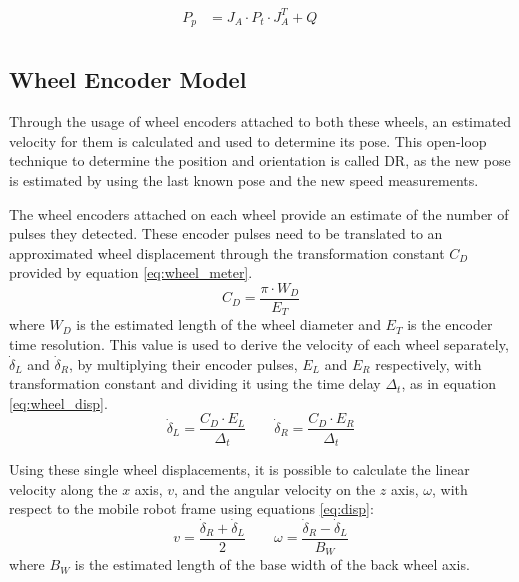 \begin{align}
    P_{p} & = J_A \cdot P_t \cdot J_A^T + Q && \\
\end{align}


\subsection{Wheel Encoder Model}

\noindent
Through the usage of wheel encoders attached to both these wheels, an estimated velocity for them is calculated and used to determine its pose.
This open-loop technique to determine the position and orientation is called \gls{DR}, as the new pose is estimated by using the last known pose and the new speed measurements.

The wheel encoders attached on each wheel provide an estimate of the number of pulses they detected. These encoder pulses need to be translated to an approximated wheel displacement through the transformation constant $C_{D}$ provided by equation \ref{eq:wheel_meter}.
\begin{equation}
C_{D} = \frac{\pi \cdot W_D }{E_T}
\label{eq:wheel_meter}
\end{equation} where $W_D$ is the estimated length of the wheel diameter and $E_T$ is the encoder time resolution.
This value is used to derive the velocity of each wheel separately, $\dot \delta_L$ and $\dot \delta_R$, by multiplying their encoder pulses, $E_L$ and  $E_R$ respectively, with transformation constant and dividing it using the time delay $\Delta_t$, as in equation \ref{eq:wheel_disp}.
\begin{equation}
\dot \delta_{L} = \frac{C_D \cdot E_L}{\Delta_t}  \qquad
\dot \delta_{R} = \frac{C_D \cdot E_R}{\Delta_t}
\label{eq:wheel_disp}
\end{equation}

Using these single wheel displacements, it is possible to calculate the linear velocity along the $x$ axis, $v$, and the angular velocity on the $z$ axis, $\omega$, with respect to the mobile robot frame using equations \ref{eq:disp}:
\begin{equation}
    v =\frac{\dot \delta_{R} + \dot \delta_{L} }{2} \qquad \omega = \frac{\dot \delta _{R} - \dot \delta_{L}}{B_W}
\label{eq:disp}
\end{equation} where $B_W$ is the estimated length of the base width of the back wheel axis.


